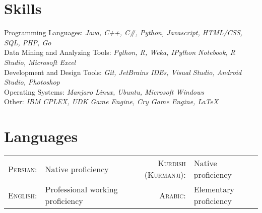 \documentclass[a4paper,10pt]{article}
\begin{document}
	\section{Skills}
		\textbullet\textnormal{ Programming Languages:}  \emph{\color{darkgray}\small Java, C++, {C\#}, Python, Javascript, HTML/CSS, SQL, PHP, Go}   \vspace{2 mm}  \\
		\textbullet\textnormal{ Data Mining and Analyzing Tools:} \emph{\color{darkgray}\small  Python, R, Weka, IPython Notebook, R Studio, Microsoft Excel} \vspace{2 mm} \\
		\textbullet\textnormal{ Development and Design Tools:} \emph{\color{darkgray}\small Git, JetBrains IDEs, Visual Studio, Android Studio, Photoshop} \vspace{2 mm} \\
		\textbullet\textnormal{ Operating Systems:} \emph{\color{darkgray}\small Manjaro Linux, Ubuntu, Microsoft Windows} \vspace{2 mm} \\
		\textbullet\textnormal{ Other:} \emph{\color{darkgray}\small IBM CPLEX, UDK Game Engine, Cry Game Engine, {\fb \LaTeX}\setmainfont[SmallCapsFont=Fontin-SmallCaps.otf]{Fontin.otf}}
	
	\section{Languages}
	\begin{tabular}{rl | rl}
		\textsc{ Persian:}&Native proficiency& \textsc{ Kurdish (Kurmanji):}&Native proficiency\\
		\textsc{ English:}&Professional working proficiency & \textsc{ Arabic:}&Elementary proficiency
	\end{tabular}
	
	
	
	
	
	
\end{document}
